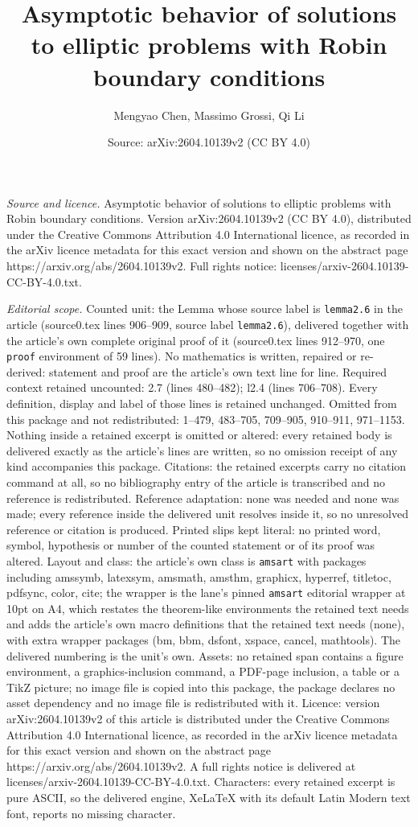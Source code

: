 \documentclass[10pt,a4paper]{amsart}
\title[Asymptotic behavior of solutions to elliptic problems with R]{Asymptotic behavior of solutions to elliptic problems with Robin boundary conditions}
\author{Mengyao Chen, Massimo Grossi, Qi Li}
\date{Source: arXiv:2604.10139v2 (CC BY 4.0)}
\begin{document}
\maketitle

\noindent\emph{Source and licence.} Asymptotic behavior of solutions to elliptic problems with Robin boundary conditions. Version arXiv:2604.10139v2 (CC BY 4.0), distributed under the Creative Commons Attribution 4.0 International licence, as recorded in the arXiv licence metadata for this exact version and shown on the abstract page https://arxiv.org/abs/2604.10139v2. Full rights notice: licenses/arxiv-2604.10139-CC-BY-4.0.txt.\par\smallskip

\noindent\textit{Editorial scope.} Counted unit: the Lemma whose source label is \texttt{lemma2.6} in the article (source0.tex lines 906--909, source label \texttt{lemma2.6}), delivered together with the article's own complete original proof of it (source0.tex lines 912--970, one \texttt{proof} environment of 59 lines). No mathematics is written, repaired or re-derived: statement and proof are the article's own text line for line. Required context retained uncounted: 2.7 (lines 480--482); l2.4 (lines 706--708). Every definition, display and label of those lines is retained unchanged. Omitted from this package and not redistributed: 1--479, 483--705, 709--905, 910--911, 971--1153. Nothing inside a retained excerpt is omitted or altered: every retained body is delivered exactly as the article's lines are written, so no omission receipt of any kind accompanies this package. Citations: the retained excerpts carry no citation command at all, so no bibliography entry of the article is transcribed and no reference is redistributed. Reference adaptation: none was needed and none was made; every reference inside the delivered unit resolves inside it, so no unresolved reference or citation is produced. Printed slips kept literal: no printed word, symbol, hypothesis or number of the counted statement or of its proof was altered. Layout and class: the article's own class is \texttt{amsart} with packages including amssymb, latexsym, amsmath, amsthm, graphicx, hyperref, titletoc, pdfsync, color, cite; the wrapper is the lane's pinned \texttt{amsart} editorial wrapper at 10pt on A4, which restates the theorem-like environments the retained text needs and adds the article's own macro definitions that the retained text needs (none), with extra wrapper packages (bm, bbm, dsfont, xspace, cancel, mathtools). The delivered numbering is the unit's own. Assets: no retained span contains a figure environment, a graphics-inclusion command, a PDF-page inclusion, a table or a TikZ picture; no image file is copied into this package, the package declares no asset dependency and no image file is redistributed with it. Licence: version arXiv:2604.10139v2 of this article is distributed under the Creative Commons Attribution 4.0 International licence, as recorded in the arXiv licence metadata for this exact version and shown on the abstract page https://arxiv.org/abs/2604.10139v2. A full rights notice is delivered at licenses/arxiv-2604.10139-CC-BY-4.0.txt. Characters: every retained excerpt is pure ASCII, so the delivered engine, XeLaTeX with its default Latin Modern text font, reports no missing character.
\end{document}
